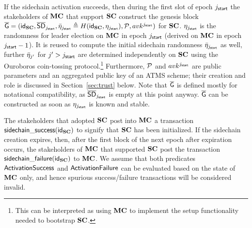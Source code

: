     If the sidechain activation succeeds, then during the first slot of epoch $j_{\mathsf{start}}$
    the stakeholders of $\mathbf{MC}$ that support $\mathbf{SC}$  construct the genesis block
    $
    \mathsf{\overline{G}}
    =(
      \mathsf{id}_{\mathbf{SC}},
      \mathsf{\overline{SD}}_{j_{\mathsf{start}}},
      \bar{\eta}_{j_{\mathsf{start}}}\triangleq H( \mathsf{id}_{\mathbf{SC}}, \eta_{j_{\mathsf{start}}}),
      \mathcal{P},
      avk^{j_{\mathsf{start}}}
    )
    $
    for $\mathbf{SC}$. $\eta_{j_{\mathsf{start}}}$ is the
    randomness for leader election on $\mathbf{MC}$ in epoch $j_{\mathsf{start}}$ (derived
    on $\mathbf{MC}$ in epoch $j_{\mathsf{start}}-1$). It is reused to compute the
    initial sidechain randomness
    $\bar{\eta}_{j_{\mathsf{start}}}$ as well, further
    $\bar{\eta}_{j'}$ for $j'>j_{\mathsf{start}}$ are determined independently on $\mathbf{SC}$ using
    the Ouroboros coin-tossing protocol.\footnote{This can be interpreted as
    using $\mathbf{MC}$ to implement the setup functionality needed to bootstrap $\mathbf{SC}$.
    }
    Furthermore, $\mathcal{P}$ and $avk^{j_{\mathsf{start}}}$ are public parameters and an aggregated public
    key of an ATMS scheme; their creation and role is
    discussed in Section~\ref{sec:trust} below.
    Note that $\mathsf{\overline{G}}$ is defined mostly for notational compatibility, as
    $\mathsf{\overline{SD}}_{j_{\mathsf{start}}}$ is empty at this point anyway.
    $\mathsf{\overline{G}}$ can be constructed as soon as %
    $\eta_{j_{\mathsf{start}}}$ is known and stable.

    The stakeholders that adopted $\mathbf{SC}$ post into $\mathbf{MC}$
    a transaction $\mathsf{sidechain\_success}(\mathsf{id}_{\mathbf{SC}})$ to
    signify that $\mathbf{SC}$ has been initialized.
    If the sidechain creation expires, then, after the first block of the next
    epoch after expiration occurs, the stakeholders of $\mathbf{MC}$ that supported
    $\mathbf{SC}$ post the transaction $\mathsf{sidechain\_failure}(\mathsf{id}_{\mathbf{SC}})$ to $\mathbf{MC}$.
    We assume that both predicates $\mathsf{ActivationSuccess}$ and $\mathsf{ActivationFailure}$ can be evaluated
    based on the state of $\mathbf{MC}$ only, and hence spurious success/failure
    transactions will be considered invalid.



